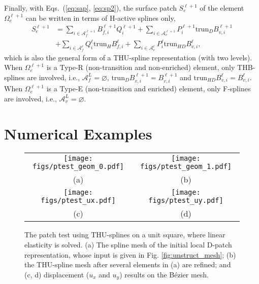 \documentclass[graybox]{svmult}
\begin{document}
Finally, with Eqs.~(\ref{eq:sap}, \ref{eq:sp2}), the surface patch $S_e^{\ell+1}$ of the element $\Omega_e^{\ell+1}$ can be written in terms of H-active splines only,
\begin{equation}
\begin{aligned}
S_{e}^{\ell+1} &= \sum_{i\in \mathcal{A}_f^{\ell+1}} B_{f\!,i}^{\ell+1} Q_i^{\ell+1} + \sum_{i\in\mathcal{A}_v^{\ell+1}} P_i^{\ell+1} \mathrm{trun}_D B_{v,i}^{\ell+1} \\
&+ \sum_{i\in\mathcal{A}_f^{\ell}} Q_i^{\ell}  \mathrm{trun}_H B_{f\!,i}^{\ell}  + \sum_{i\in\mathcal{A}_v^\ell} P_i^{\ell}  \mathrm{trun}_{H\!D} B_{v,i}^{\ell},
\end{aligned}
\label{eq:thu_rep}
\end{equation}
which is also the general form of a THU-spline representation (with two levels). When $\Omega_e^{\ell+1}$ is a Type-R (non-transition and non-enriched) element, only THB-splines are involved, i.e., $\mathcal{A}_f^L=\varnothing$, $\mathrm{trun}_D B_{v,i}^{\ell+1}= B_{v,i}^{\ell+1}$ and $\mathrm{trun}_{H\!D} B_{v,i}^{\ell}= B_{v,i}^{\ell}$. When $\Omega_e^{\ell+1}$ is a Type-E (non-transition and enriched) element, only F-splines are involved, i.e., $\mathcal{A}_v^L=\varnothing$.

\section{Numerical Examples}
\label{sec:example}

\begin{figure}[htb]
\centering
\begin{tabular}{cc}
\texttt{[image: figs/ptest\_geom\_0.pdf]} & \hspace{+1mm}
\texttt{[image: figs/ptest\_geom\_1.pdf]} \\
(a) & (b) \\
\texttt{[image: figs/ptest\_ux.pdf]} & \hspace{+1mm}
\texttt{[image: figs/ptest\_uy.pdf]} \\
(c) & (d) \\
\end{tabular}
\caption{The patch test using THU-splines on a unit square, where linear elasticity is solved. (a) The spline mesh of the initial local D-patch representation, whose input is given in Fig. \ref{fig:unstruct_mesh}; (b) the THU-spline mesh after several elements in (a) are refined; and (c, d) displacement ($u_x$ and $u_y$) results on the B\'{e}zier mesh. }
\label{fig:patch_test}
\end{figure}
\end{document}

